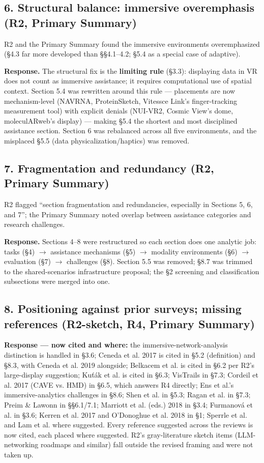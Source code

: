 \documentclass[11pt]{article}
\begin{document}
\subsection*{6. Structural balance: immersive overemphasis (R2, Primary Summary)}

R2 and the Primary Summary found the immersive environments overemphasized (\S4.3 far more developed than \S\S4.1--4.2; \S5.4 as a special case of adaptive).

\textbf{Response.} The structural fix is the \textbf{limiting rule} (\S3.3): displaying data in VR does not count as immersive assistance; it requires computational use of spatial context. Section 5.4 was rewritten around this rule — placements are now mechanism-level (NAVRNA, ProteinSketch, Vitessce Link's finger-tracking measurement tool) with explicit denials (NUI-VR2, Cosmic View's dome, moleculARweb's display) — making \S5.4 the shortest and most disciplined assistance section. Section 6 was rebalanced across all five environments, and the misplaced \S5.5 (data physicalization/haptics) was removed.

\subsection*{7. Fragmentation and redundancy (R2, Primary Summary)}

R2 flagged ``section fragmentation and redundancies, especially in Sections 5, 6, and 7''; the Primary Summary noted overlap between assistance categories and research challenges.

\textbf{Response.} Sections 4--8 were restructured so each section does one analytic job: tasks (\S4) $\rightarrow$ assistance mechanisms (\S5) $\rightarrow$ modality environments (\S6) $\rightarrow$ evaluation (\S7) $\rightarrow$ challenges (\S8). Section 5.5 was removed; \S8.7 was trimmed to the shared-scenarios infrastructure proposal; the \S2 screening and classification subsections were merged into one.

\subsection*{8. Positioning against prior surveys; missing references (R2-sketch, R4, Primary Summary)}

\textbf{Response — now cited and where:} the immersive-network-analysis distinction is handled in \S3.6; Ceneda et al. 2017 is cited in \S5.2 (definition) and \S8.3, with Ceneda et al. 2019 alongside; Belkacem et al. is cited in \S6.2 per R2's large-display suggestion; Kuťák et al. is cited in \S6.3; VisTrails in \S7.3; Cordeil et al. 2017 (CAVE vs. HMD) in \S6.5, which answers R4 directly; Ens et al.'s immersive-analytics challenges in \S8.6; Shen et al. in \S5.3; Ragan et al. in \S7.3; Preim \& Lawonn in \S\S6.1/7.1; Marriott et al. (eds.) 2018 in \S3.4; Furmanová et al. in \S3.6; Kerren et al. 2017 and O'Donoghue et al. 2018 in \S1; Sperrle et al. and Lam et al. where suggested. Every reference suggested across the reviews is now cited, each placed where suggested. R2's gray-literature sketch items (LLM-networking roadmaps and similar) fall outside the revised framing and were not taken up.
\end{document}
